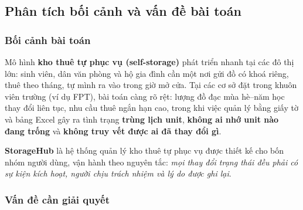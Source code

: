 \documentclass[12pt,a4paper]{article}
\renewcommand{\_}{\textunderscore\allowbreak}
\begin{document}
\subsection{Phân tích bối cảnh và vấn đề bài toán}

\subsubsection{Bối cảnh bài toán}

Mô hình \textbf{kho thuê tự phục vụ (self-storage)} phát triển nhanh tại các đô thị lớn: sinh viên, dân văn phòng và hộ gia đình cần một nơi gửi đồ có khoá riêng, thuê theo tháng, tự mình ra vào trong giờ mở cửa. Tại các cơ sở đặt trong khuôn viên trường (ví dụ FPT), bài toán càng rõ rệt: lượng đồ đạc mùa hè--năm học thay đổi liên tục, nhu cầu thuê ngắn hạn cao, trong khi việc quản lý bằng giấy tờ và bảng Excel gây ra tình trạng \textbf{trùng lịch unit}, \textbf{không ai nhớ unit nào đang trống} và \textbf{không truy vết được ai đã thay đổi gì}.

\textbf{StorageHub} là hệ thống quản lý kho thuê tự phục vụ được thiết kế cho bốn nhóm người dùng, vận hành theo nguyên tắc: \textit{mọi thay đổi trạng thái đều phải có sự kiện kích hoạt, người chịu trách nhiệm và lý do được ghi lại}.

\subsubsection{Vấn đề cần giải quyết}
\end{document}
